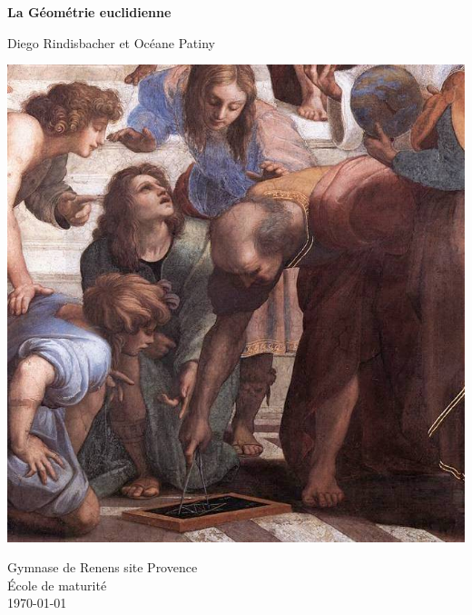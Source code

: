 \documentclass[a4paper,12pt]{article}
\begin{document}
\begin{titlepage}
    \begin{center}
        
        \Huge
        \textbf{La Géométrie euclidienne}
        
        \vspace{0.5cm}
        \large
        Diego Rindisbacher et Océane Patiny
        
        
         \vspace{3cm}
          \includegraphics[scale=2.5]{Euclide.jpg}
          
         \vspace{0.5cm}
          \small
        Gymnase de Renens site Provence\\
        École de maturité\\
        \today
    \end{center}
\end{titlepage}
\end{document}
